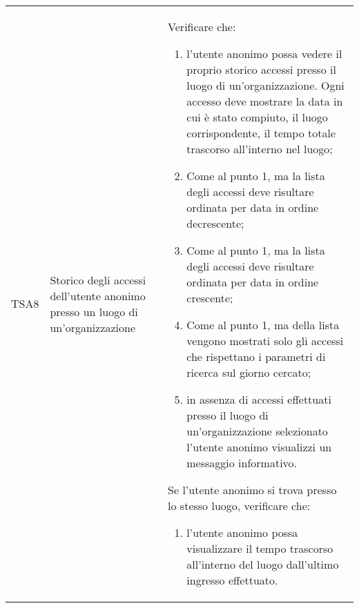 {\begin{longtable}{ c | C{3cm} | C{11cm} }
TSA8& Storico degli accessi dell'utente anonimo presso un luogo di un'organizzazione & 
Verificare che:    
\begin{enumerate}
    \item l'utente anonimo possa vedere il proprio storico accessi presso il luogo di un'organizzazione. Ogni accesso deve mostrare la data in cui è stato compiuto, il luogo corrispondente, il tempo totale trascorso all'interno nel luogo;
    \item Come al punto 1, ma la lista degli accessi deve risultare ordinata per data in ordine decrescente;
    \item Come al punto 1, ma la lista degli accessi deve risultare ordinata per data in ordine crescente;
    \item Come al punto 1, ma della lista vengono mostrati solo gli accessi che rispettano i parametri di ricerca sul giorno cercato;
    \item in assenza di accessi effettuati presso il luogo di un'organizzazione selezionato l'utente anonimo visualizzi un messaggio informativo.
\end{enumerate}
Se l'utente anonimo si trova presso lo stesso luogo, verificare che:
\begin{enumerate}
    \item l'utente anonimo possa visualizzare il tempo trascorso all'interno del luogo dall'ultimo ingresso effettuato.
\end{enumerate} \\


\end{longtable}}
